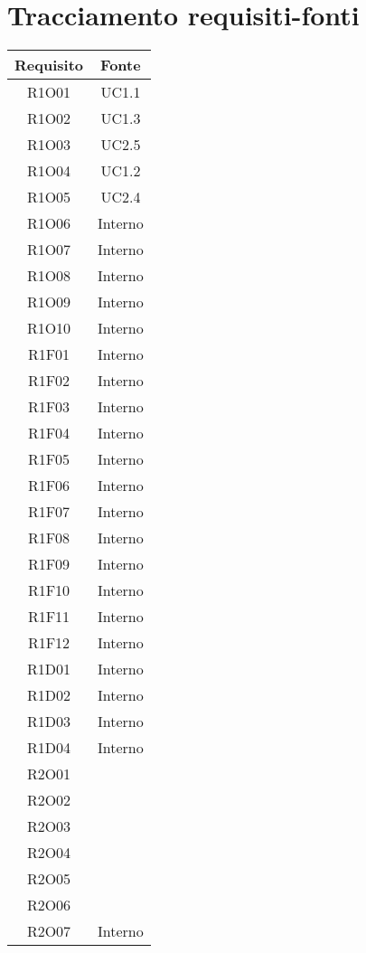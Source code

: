 \section{Tracciamento requisiti-fonti}
\begin{tabularx}{\textwidth}{|C|C|}
	\hline
	\textbf{Requisito} & \textbf{Fonte} \\
	\hline
	\endhead
	R1O01& UC1.1\\
	\hline
	R1O02& UC1.3\\
	\hline
	R1O03& UC2.5\\
	\hline
	R1O04& UC1.2\\
	\hline
	R1O05& UC2.4\\
	\hline
	R1O06& Interno\\
	\hline
	R1O07& Interno\\
	\hline	
	R1O08& Interno\\
	\hline
	R1O09& Interno\\
	\hline	
	R1O10& Interno\\
	\hline
	R1F01& Interno\\
	\hline
	R1F02& Interno\\
	\hline
	R1F03& Interno\\
	\hline
	R1F04& Interno\\
	\hline
	R1F05& Interno\\
	\hline
	R1F06& Interno\\
	\hline
	R1F07& Interno\\
	\hline
	R1F08& Interno\\
	\hline
	R1F09& Interno\\
	\hline
	R1F10& Interno\\
	\hline
	R1F11& Interno\\
	\hline
	R1F12& Interno\\
	\hline
	R1D01& Interno\\
	\hline
	R1D02& Interno\\
	\hline
	R1D03& Interno\\
	\hline
	R1D04& Interno\\
	\hline
	R2O01&\\
	\hline
	R2O02&\\
	\hline
	R2O03&\\
	\hline
	R2O04&\\
	\hline
	R2O05&\\
	\hline
	R2O06&\\
	\hline
	R2O07&Interno\\

\end{tabularx}
